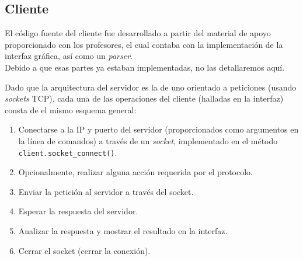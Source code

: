 \subsection{Cliente}

El código fuente del cliente fue desarrollado a partir del material de apoyo proporcionado con los profesores, el cual contaba con la implementación de la interfaz gráfica, así como un \textit{parser}.\\
Debido a que esas partes ya estaban implementadas, no las detallaremos aquí.\newline

Dado que la arquitectura del servidor es la de uno orientado a peticiones (usando \textit{sockets} TCP), cada una de las operaciones del cliente (halladas en la interfaz) consta de el mismo esquema general:
\begin{enumerate}
    \item Conectarse a la IP y puerto del servidor (proporcionados como argumentos en la línea de comandos) a través de un \textit{socket}, implementado en el método \texttt{client.socket\_connect()}.
    \item Opcionalmente, realizar alguna acción requerida por el protocolo.
    \item Enviar la petición al servidor a través del socket.
    \item Esperar la respuesta del servidor.
    \item Analizar la respuesta y mostrar el resultado en la interfaz.
    \item Cerrar el socket (cerrar la conexión).
\end{enumerate}

